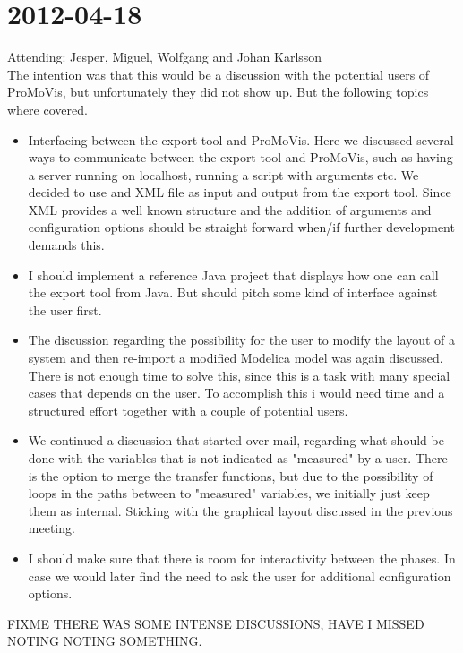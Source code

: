 \section{2012-04-18}
Attending: Jesper, Miguel, Wolfgang and Johan Karlsson\\\newline The intention was that this would be a discussion with the potential users of ProMoVis, but unfortunately they did not show up. But the following topics where covered.
\begin{itemize}
\item Interfacing between the export tool and ProMoVis. Here we discussed several ways to communicate between the export tool and ProMoVis, such as having a server running on localhost, running a script with arguments etc. We decided to use and XML file as input and output from the export tool. Since XML provides a well known structure and the addition of arguments and configuration options should be straight forward when/if further development demands this. 
\item I should implement a reference Java project that displays how one can call the export tool from Java. But should pitch some kind of interface against the user first.
\item The discussion regarding the possibility for the user to modify the layout of a system and then re-import a modified Modelica model was again discussed. There is not enough time to solve this, since this is a task with many special cases that depends on the user. To accomplish this i would need time and a structured effort together with a couple of potential users. 
\item We continued a discussion that started over mail, regarding what should be done with the variables that is not indicated as "measured" by a user. There is the option to merge the transfer functions, but due to the possibility of loops in the paths between to "measured" variables, we initially just keep them as internal. Sticking with the graphical layout discussed in the previous meeting.
\item I should make sure that there is room for interactivity between the phases. In case we would later find the need to ask the user for additional configuration options.
\end{itemize}
FIXME THERE WAS SOME INTENSE DISCUSSIONS, HAVE I MISSED NOTING NOTING SOMETHING.


